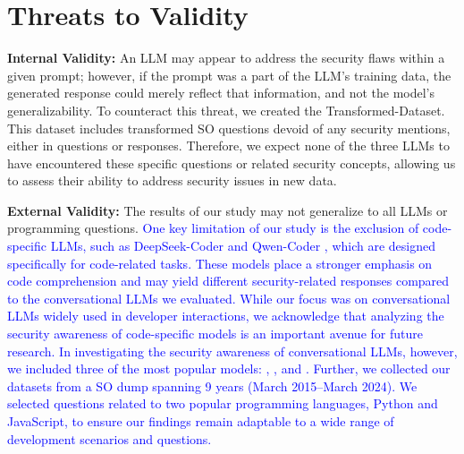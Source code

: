 \section{Threats to Validity}


\textbf{Internal Validity:} An LLM may appear to address the security flaws within a given prompt; however, if the prompt was a part of the LLM's training data, the generated response could merely reflect that information, and not the model's generalizability. To counteract this threat, we created the Transformed-Dataset. This dataset includes transformed SO questions devoid of any security mentions, either in questions or responses. Therefore, we expect 
none of the three LLMs to have encountered these specific questions or related security concepts, allowing us to assess their ability to address security issues in new data. 

\textbf{External Validity:} The results of our study may not generalize to all LLMs or programming questions. %
\textcolor{blue}{One key limitation of our study is the exclusion of code-specific LLMs, such as DeepSeek-Coder \cite{deepseekcoder} and Qwen-Coder \cite{hui2024qwen2}, which are designed specifically for code-related tasks. These models place a stronger emphasis on code comprehension and may yield different security-related responses compared to the conversational LLMs we evaluated. While our focus was on conversational LLMs widely used in developer interactions, we acknowledge that analyzing the security awareness of code-specific models is an important avenue for future research. In investigating the security awareness of conversational LLMs, however, we included three of the most popular models: \gpt, \llama, and \claude. Further, we collected our datasets from a SO dump spanning 9 years (March 2015–March 2024). We selected questions related to two popular programming languages, Python and JavaScript, to ensure our findings remain adaptable to a wide range of development scenarios and questions.}


